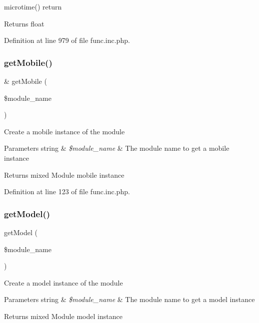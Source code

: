 microtime() return

\begin{DoxyReturn}{Returns}
float 
\end{DoxyReturn}


Definition at line 979 of file func.\+inc.\+php.

\mbox{\label{func_8inc_8php_a26d3f423593da53eb90bb738aeed23ea}} 
\subsubsection{\texorpdfstring{get\+Mobile()}{getMobile()}}
{\footnotesize\ttfamily \& get\+Mobile (\begin{DoxyParamCaption}\item[{}]{\$module\+\_\+name }\end{DoxyParamCaption})}

Create a mobile instance of the module


\begin{DoxyParams}[1]{Parameters}
string & {\em \$module\+\_\+name} & The module name to get a mobile instance \\
\hline
\end{DoxyParams}
\begin{DoxyReturn}{Returns}
mixed Module mobile instance 
\end{DoxyReturn}


Definition at line 123 of file func.\+inc.\+php.

\mbox{\label{func_8inc_8php_aecdfcc5332bcf22df01fc21a03b64435}} 
\subsubsection{\texorpdfstring{get\+Model()}{getModel()}}
{\footnotesize\ttfamily get\+Model (\begin{DoxyParamCaption}\item[{}]{\$module\+\_\+name }\end{DoxyParamCaption})}

Create a model instance of the module


\begin{DoxyParams}[1]{Parameters}
string & {\em \$module\+\_\+name} & The module name to get a model instance \\
\hline
\end{DoxyParams}
\begin{DoxyReturn}{Returns}
mixed Module model instance 
\end{DoxyReturn}


